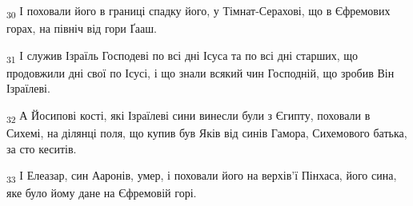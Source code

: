 \begin{tcolorbox}
\textsubscript{30} І поховали його в границі спадку його, у Тімнат-Серахові, що в Єфремових горах, на північ від гори Ґааш.
\end{tcolorbox}
\begin{tcolorbox}
\textsubscript{31} І служив Ізраїль Господеві по всі дні Ісуса та по всі дні старших, що продовжили дні свої по Ісусі, і що знали всякий чин Господній, що зробив Він Ізраїлеві.
\end{tcolorbox}
\begin{tcolorbox}
\textsubscript{32} А Йосипові кості, які Ізраїлеві сини винесли були з Єгипту, поховали в Сихемі, на ділянці поля, що купив був Яків від синів Гамора, Сихемового батька, за сто кеситів.
\end{tcolorbox}
\begin{tcolorbox}
\textsubscript{33} І Елеазар, син Ааронів, умер, і поховали його на верхів'ї Пінхаса, його сина, яке було йому дане на Єфремовій горі.
\end{tcolorbox}
